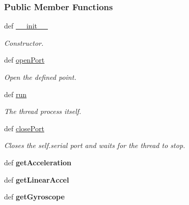 \subsubsection*{Public Member Functions}
\begin{DoxyCompactItemize}
\item 
def \hyperlink{classserial_thread__mutiprocessing_1_1_serial_thread_a1e8d9f128a8591dc91bc14e2e3dfea40}{\-\_\-\-\_\-init\-\_\-\-\_\-}
\begin{DoxyCompactList}\small\item\em Constructor. \end{DoxyCompactList}\item 
def \hyperlink{classserial_thread__mutiprocessing_1_1_serial_thread_a49c1452622fb407aef0f413c5cab3099}{open\-Port}
\begin{DoxyCompactList}\small\item\em Open the defined point. \end{DoxyCompactList}\item 
def \hyperlink{classserial_thread__mutiprocessing_1_1_serial_thread_aa4ea3b84bdda2e44d009d19ac2f0ab88}{run}
\begin{DoxyCompactList}\small\item\em The thread process itself. \end{DoxyCompactList}\item 
def \hyperlink{classserial_thread__mutiprocessing_1_1_serial_thread_af1dcde994351eb5cf14d9232537481b9}{close\-Port}
\begin{DoxyCompactList}\small\item\em Closes the self.\-serial port and waits for the thread to stop. \end{DoxyCompactList}\item 
\hypertarget{classserial_thread__mutiprocessing_1_1_serial_thread_a21d756af58ff7307c11f4bd561466334}{def {\bfseries get\-Acceleration}}\label{classserial_thread__mutiprocessing_1_1_serial_thread_a21d756af58ff7307c11f4bd561466334}

\item 
\hypertarget{classserial_thread__mutiprocessing_1_1_serial_thread_aba2db486301fefccdae03ae340929e8f}{def {\bfseries get\-Linear\-Accel}}\label{classserial_thread__mutiprocessing_1_1_serial_thread_aba2db486301fefccdae03ae340929e8f}

\item 
\hypertarget{classserial_thread__mutiprocessing_1_1_serial_thread_aae16862501d11804556514c61000b7ca}{def {\bfseries get\-Gyroscope}}\label{classserial_thread__mutiprocessing_1_1_serial_thread_aae16862501d11804556514c61000b7ca}


\end{DoxyCompactItemize}
